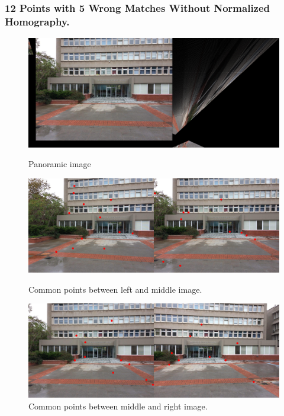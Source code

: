 \documentclass[letterpaper,12pt]{article}
\begin{document}
\subsubsection{12 Points with 5 Wrong Matches Without Normalized Homography.}
\begin{figure}[!htb]
        \centering\includegraphics[width=1\columnwidth]{experiments/12points/final5wrong.jpg}
          \caption{
                \label{} Panoramic image
        }
        \centering\includegraphics[width=1\columnwidth]{experiments/12points/left-1_middle5wrong.jpg}
          \caption{
                \label{} Common points between left and middle image.
        }
        \centering\includegraphics[width=1\columnwidth]{experiments/12points/middle_left-15wrong.jpg}
        \caption{
                \label{} Common points between middle and right image.
        }
\end{figure}
\FloatBarrier
\newpage
\end{document}
